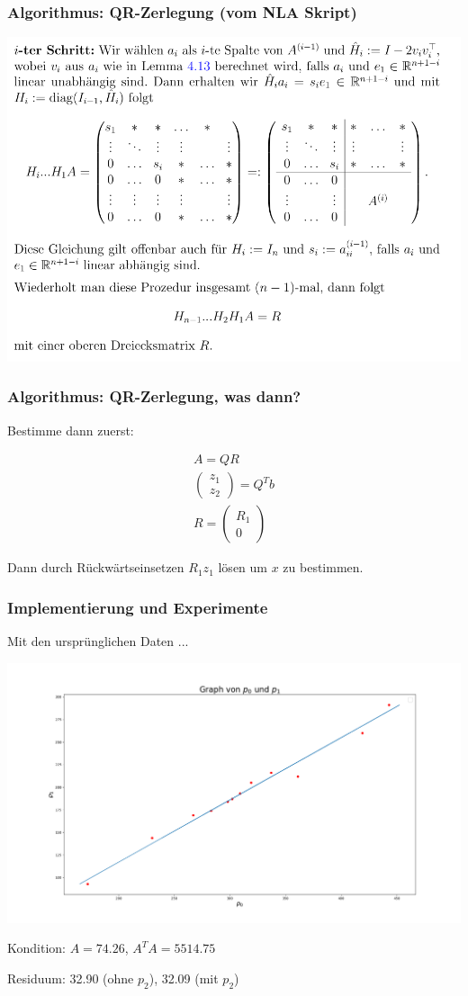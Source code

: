 \documentclass{beamer}
\begin{document}
\begin{frame}
\frametitle{Algorithmus: QR-Zerlegung (vom NLA Skript)}
\includegraphics[width=\textwidth]{alg2.png}
\end{frame}

\begin{frame}
\frametitle{Algorithmus: QR-Zerlegung, was dann?}

Bestimme dann zuerst:

\begin{align*}
A = QR \\
\begin{pmatrix}
z_1 \\
z_2
\end{pmatrix} = Q^T b \\
R = \begin{pmatrix}
R_1 \\
0
\end{pmatrix}
\end{align*}

Dann durch Rückwärtseinsetzen $R_1 z_1$ lösen um $x$ zu bestimmen.

\end{frame}


\begin{frame}
\frametitle{Implementierung und Experimente}

Mit den ursprünglichen Daten ...

\includegraphics[width=\textwidth]{plot.png}

Kondition: $A = 74.26$, $A^T A = 5514.75$

Residuum: 32.90 (ohne $p_2$), 32.09 (mit $p_2$)
\end{frame}
\end{document}
